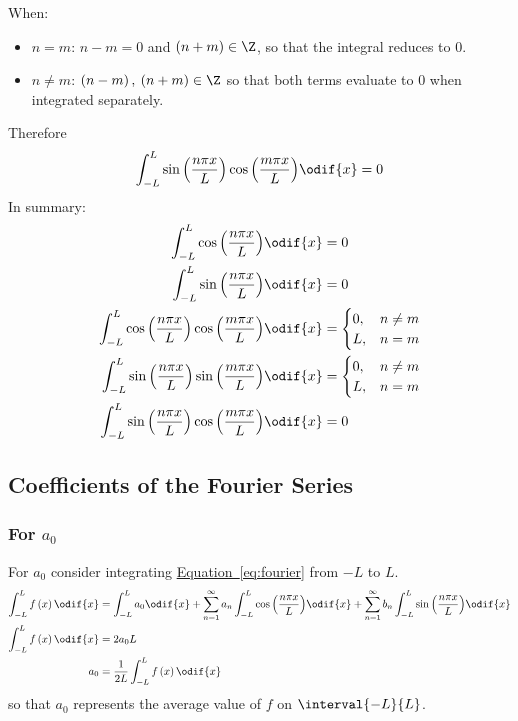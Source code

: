 \documentclass{article}
\begin{document}
When:
\begin{itemize}
    \item \(n = m\): \(n - m = 0\) and \(\left( n + m \right) \in \Z\), so that the integral reduces to \(0\).
    \item \(n \neq m\): \(\left( n - m \right),\: \left( n + m \right) \in \Z\) so that both terms evaluate to \(0\) when integrated separately.
\end{itemize}
Therefore
\begin{equation*}
    \int_{-L}^L \sin{\left( \frac{n \pi x}{L} \right)} \cos{\left( \frac{m \pi x}{L} \right)} \odif{x} = 0
\end{equation*}
In summary:
\begin{align}
    \int_{-L}^L \cos{\left( \frac{n \pi x}{L} \right)} \odif{x}                                        & = 0 \label{eq:cosine} \\
    \int_{-L}^L \sin{\left( \frac{n \pi x}{L} \right)} \odif{x}                                        & = 0 \label{eq:sine}   \\
    \int_{-L}^L \cos{\left( \frac{n \pi x}{L} \right)} \cos{\left( \frac{m \pi x}{L} \right)} \odif{x} & =
    \begin{cases}
        0, & n \neq m \\
        L, & n = m
    \end{cases}
    \\
    \int_{-L}^L \sin{\left( \frac{n \pi x}{L} \right)} \sin{\left( \frac{m \pi x}{L} \right)} \odif{x} & =
    \begin{cases}
        0, & n \neq m \\
        L, & n = m
    \end{cases}
    \\
    \int_{-L}^L \sin{\left( \frac{n \pi x}{L} \right)} \cos{\left( \frac{m \pi x}{L} \right)} \odif{x} & = 0
\end{align}

\subsection{Coefficients of the Fourier Series}
\subsubsection{For \texorpdfstring{\(a_0\)}{a0}}
For \(a_0\) consider integrating \hyperref[eq:fourier]{Equation~\ref{eq:fourier}} from \(-L\) to \(L\).
\begin{align*}
    \int_{-L}^L f\left( x \right) \odif{x} & = \int_{-L}^L a_0 \odif{x} + \sum_{n = 1}^\infty a_n \int_{-L}^L \cos{\left( \frac{n \pi x}{L} \right)} \odif{x} + \sum_{n = 1}^\infty b_n \int_{-L}^L \sin{\left( \frac{n \pi x}{L} \right)} \odif{x} \\
    \int_{-L}^L f\left( x \right) \odif{x} & = 2 a_0 L                                                                                                                                                                                              \\
    a_0                                    & = \frac{1}{2L} \int_{-L}^L f\left( x \right) \odif{x}
\end{align*}
so that \(a_0\) represents the average value of \(f\) on \(\interval{-L}{L}\).
\end{document}
